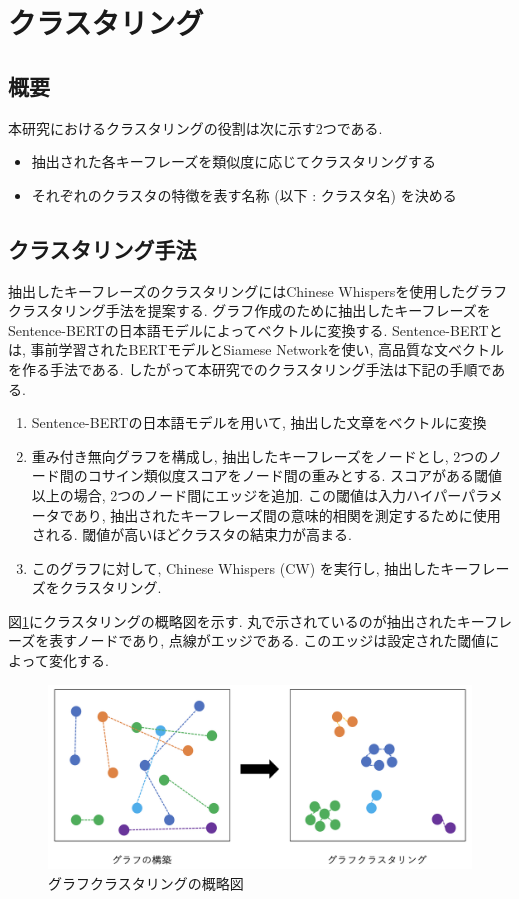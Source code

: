 
\section{クラスタリング}
\subsection{概要}
本研究におけるクラスタリングの役割は次に示す2つである. 
\begin{itemize}
  \item 抽出された各キーフレーズを類似度に応じてクラスタリングする
  \item それぞれのクラスタの特徴を表す名称 (以下 : クラスタ名) を決める
\end{itemize}

\subsection{クラスタリング手法}\label{graph_clustering}
抽出したキーフレーズのクラスタリングにはChinese Whispers\cite{chinese-whispers}を使用したグラフクラスタリング手法を提案する. グラフ作成のために抽出したキーフレーズをSentence-BERTの日本語モデルによってベクトルに変換する. Sentence-BERT\cite{sentence-bert}とは, 事前学習されたBERTモデルとSiamese Networkを使い, 高品質な文ベクトルを作る手法である. 
したがって本研究でのクラスタリング手法は下記の手順である. 
\begin{enumerate}
  \item Sentence-BERTの日本語モデルを用いて, 抽出した文章をベクトルに変換
  \item 重み付き無向グラフを構成し, 抽出したキーフレーズをノードとし, 2つのノード間のコサイン類似度スコアをノード間の重みとする. スコアがある閾値以上の場合, 2つのノード間にエッジを追加. この閾値は入力ハイパーパラメータであり, 抽出されたキーフレーズ間の意味的相関を測定するために使用される. 閾値が高いほどクラスタの結束力が高まる. 
  \item このグラフに対して, Chinese Whispers (CW) を実行し, 抽出したキーフレーズをクラスタリング. 
\end{enumerate}

図\ref{fig:clustering}にクラスタリングの概略図を示す. 丸で示されているのが抽出されたキーフレーズを表すノードであり, 点線がエッジである. このエッジは設定された閾値によって変化する. 
\begin{figure}[H]
  \centering
  \includegraphics[scale=0.4]
       {contents/images/clustering.png}
  \caption{グラフクラスタリングの概略図\label{fig:clustering}}
\end{figure}

